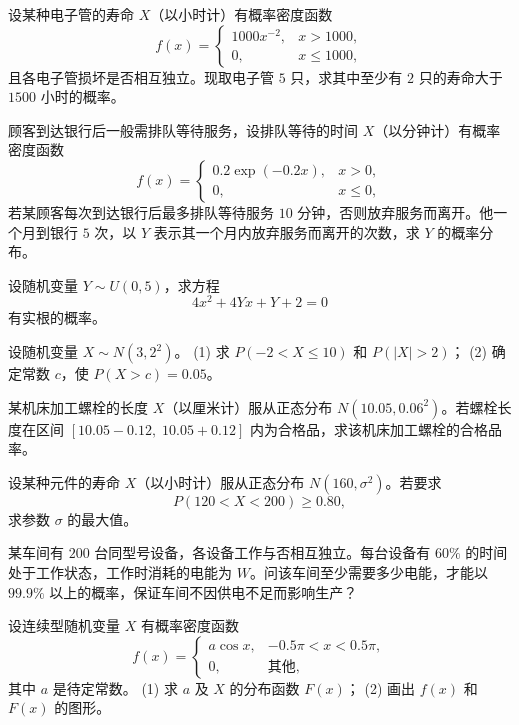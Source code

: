 \begin{homework}[2.16]
设某种电子管的寿命 $X$（以小时计）有概率密度函数
\[
f(x) =
\begin{cases}
1000 x^{-2}, & x > 1000, \\[6pt]
0, & x \leq 1000,
\end{cases}
\]
且各电子管损坏是否相互独立。现取电子管 $5$ 只，求其中至少有 $2$ 只的寿命大于 $1500$ 小时的概率。
\end{homework}
\begin{homework}[2.17]
顾客到达银行后一般需排队等待服务，设排队等待的时间 $X$（以分钟计）有概率密度函数
\[
f(x) =
\begin{cases}
0.2 \exp(-0.2x), & x > 0, \\[6pt]
0, & x \leq 0,
\end{cases}
\]
若某顾客每次到达银行后最多排队等待服务 $10$ 分钟，否则放弃服务而离开。他一个月到银行 $5$ 次，以 $Y$ 表示其一个月内放弃服务而离开的次数，求 $Y$ 的概率分布。
\end{homework}

\begin{homework}[2.18]
设随机变量 $Y \sim U(0,5)$，求方程
\[
4x^2 + 4Yx + Y + 2 = 0
\]
有实根的概率。
\end{homework}

\begin{homework}[2.19]
设随机变量 $X \sim N(3, 2^2)$。  
(1) 求 $P(-2 < X \leq 10)$ 和 $P(|X| > 2)$；  
(2) 确定常数 $c$，使 $P(X > c) = 0.05$。
\end{homework}

\begin{homework}[2.20]
某机床加工螺栓的长度 $X$（以厘米计）服从正态分布 $N(10.05, 0.06^2)$。若螺栓长度在区间 $[10.05-0.12,\; 10.05+0.12]$ 内为合格品，求该机床加工螺栓的合格品率。
\end{homework}

\begin{homework}[2.21]
设某种元件的寿命 $X$（以小时计）服从正态分布 $N(160,\sigma^2)$。若要求
\[
P(120 < X < 200) \geq 0.80,
\]
求参数 $\sigma$ 的最大值。
\end{homework}

\begin{homework}[2.22]
某车间有 $200$ 台同型号设备，各设备工作与否相互独立。每台设备有 $60\%$ 的时间处于工作状态，工作时消耗的电能为 $W$。问该车间至少需要多少电能，才能以 $99.9\%$ 以上的概率，保证车间不因供电不足而影响生产？
\end{homework}

\begin{homework}[2.23]
设连续型随机变量 $X$ 有概率密度函数
\[
f(x) =
\begin{cases}
a \cos x, & -0.5\pi < x < 0.5\pi, \\[6pt]
0, & \text{其他},
\end{cases}
\]
其中 $a$ 是待定常数。  
(1) 求 $a$ 及 $X$ 的分布函数 $F(x)$；  
(2) 画出 $f(x)$ 和 $F(x)$ 的图形。
\end{homework}

